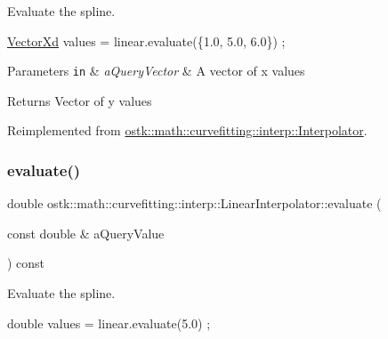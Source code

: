 Evaluate the spline. 


\begin{DoxyCode}
\hyperlink{namespaceostk_1_1math_1_1obj_a84bdc62967e939556fb94869024693ff}{VectorXd} values = linear.evaluate(\{1.0, 5.0, 6.0\}) ;
\end{DoxyCode}



\begin{DoxyParams}[1]{Parameters}
\mbox{\tt in}  & {\em a\+Query\+Vector} & A vector of x values \\
\hline
\end{DoxyParams}
\begin{DoxyReturn}{Returns}
Vector of y values 
\end{DoxyReturn}


Reimplemented from \hyperlink{classostk_1_1math_1_1curvefitting_1_1interp_1_1_interpolator_aac2035e403234027b227479d1e1b544e}{ostk\+::math\+::curvefitting\+::interp\+::\+Interpolator}.

\mbox{\label{classostk_1_1math_1_1curvefitting_1_1interp_1_1_linear_interpolator_ade4cbbc6da45e0dedd71d86a45258512}} 
\subsubsection{\texorpdfstring{evaluate()}{evaluate()}\hspace{0.1cm}{\footnotesize\ttfamily [2/2]}}
{\footnotesize\ttfamily double ostk\+::math\+::curvefitting\+::interp\+::\+Linear\+Interpolator\+::evaluate (\begin{DoxyParamCaption}\item[{const double \&}]{a\+Query\+Value }\end{DoxyParamCaption}) const\hspace{0.3cm}{\ttfamily [virtual]}}



Evaluate the spline. 


\begin{DoxyCode}
\textcolor{keywordtype}{double} values = linear.evaluate(5.0) ;
\end{DoxyCode}




